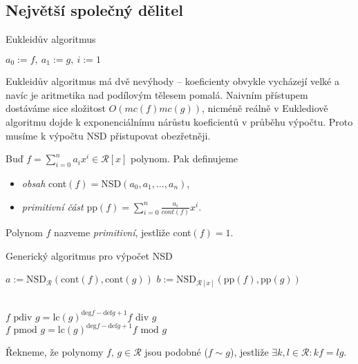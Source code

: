 \subsection*{Největší společný dělitel}

\begin{algorithm}
    \caption{Eukleidův algoritmus}
    $a_0:=f,\ a_1:=g,\ i:=1$\;
    \vspace{0.2cm}
\end{algorithm}

Eukleidův algoritmus má dvě nevýhody -- koeficienty obvykle vycházejí velké a navíc je aritmetika nad podílovým tělesem pomalá. Naivním přístupem dostáváme sice složitost $O(mc(f)mc(g))$, nicméně reálně v Euklediově algoritmu dojde k exponenciálnímu nárůstu koeficientů v průběhu výpočtu. Proto musíme k výpočtu NSD přistupovat obezřetněji.

\begin{defn}
    Buď $f=\sum\limits_{i=0}^na_ix^i \in \mathcal{R}[x]$ polynom. Pak definujeme
    \begin{itemize}
        \item \textit{obsah} cont$(f)=$NSD$(a_0,a_1,\dots,a_n)$,
        \item \textit{primitivní část} pp$(f)=\sum\limits_{i=0}^n\frac{a_i}{cont(f)}x^i$.
    \end{itemize}
    Polynom $f$ nazveme \textit{primitivní}, jestliže cont$(f)=1$.
\end{defn}

\begin{algorithm}
    \caption{Generický algoritmus pro výpočet NSD}
    $a:=\text{NSD}_\mathcal{R}(\text{cont}(f),\text{cont}(g))$\;
    $b:=\text{NSD}_{\mathcal{R}[x]}(\text{pp}(f),\text{pp}(g))$\;
    \vspace{0.2cm}
\end{algorithm}

\begin{defn}[Pseudodělení]~\\
    $f \text{ pdiv } g = \text{lc}(g)^{\text{deg}f-\text{def}g+1}f\text{ div }g$\\
    $f \text{ pmod } g = \text{lc}(g)^{\text{deg}f-\text{def}g+1}f\text{ mod }g$
\end{defn}

\begin{defn}
    Řekneme, že polynomy $f,\,g \in \mathcal{R}$ jsou podobné ($f\sim g$), jestliže $\exists k,l \in \mathcal{R}: kf=lg$.
\end{defn}


